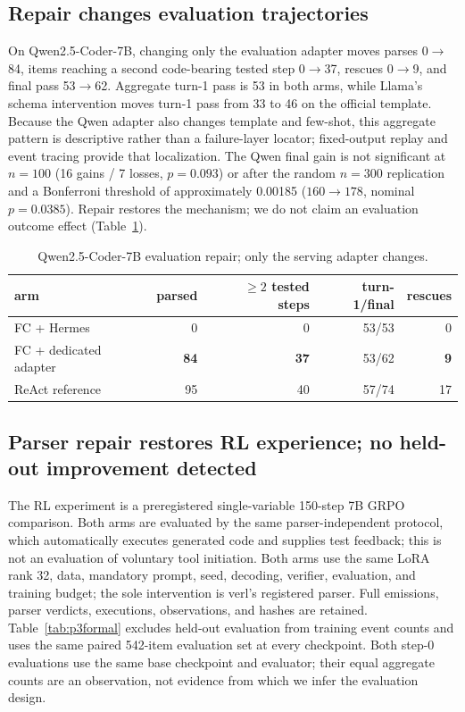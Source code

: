 \subsection{Repair changes evaluation trajectories}
\label{sec:repair}
\label{sec:maintable}

On Qwen2.5-Coder-7B, changing only the evaluation adapter moves parses 0$\rightarrow$84, items
reaching a second code-bearing tested step 0$\rightarrow$37, rescues 0$\rightarrow$9, and final pass
53$\rightarrow$62. Aggregate turn-1 pass is 53 in both arms, while Llama's schema intervention
moves turn-1 pass from 33 to 46 on the official template. Because the Qwen adapter also changes template and few-shot, this
aggregate pattern is descriptive rather than a failure-layer locator; fixed-output replay and
event tracing provide that localization. The Qwen final gain is not significant at
$n=100$ (16 gains / 7 losses, $p=0.093$) or after the random $n=300$ replication and a Bonferroni threshold of
approximately 0.00185 ($160\rightarrow178$, nominal $p=0.0385$). Repair restores the mechanism;
we do not claim an evaluation outcome effect (Table~\ref{tab:repair_main}).

\begin{table}[H]
\caption{Qwen2.5-Coder-7B evaluation repair; only the serving adapter changes.}
\label{tab:repair_main}
\centering
\small
\begin{tabular}{lrrrr}
\toprule
arm & parsed & $\geq2$ tested steps & turn-1/final & rescues \\
\midrule
FC + Hermes & 0 & 0 & 53/53 & 0 \\
FC + dedicated adapter & \textbf{84} & \textbf{37} & 53/62 & \textbf{9} \\
ReAct reference & 95 & 40 & 57/74 & 17 \\
\bottomrule
\end{tabular}
\end{table}

\subsection{Parser repair restores RL experience; no held-out improvement detected}
\label{sec:rl}
\label{sec:norepair}
\label{sec:sufficiency}

The RL experiment is a preregistered single-variable 150-step 7B GRPO comparison. Both arms
are evaluated by the same parser-independent protocol, which automatically executes generated
code and supplies test feedback; this is not an evaluation of voluntary tool initiation. Both arms use the same
LoRA rank 32, data, mandatory prompt, seed, decoding, verifier, evaluation, and training budget;
the sole intervention is verl's registered parser. Full emissions, parser verdicts, executions,
observations, and hashes are retained. Table~\ref{tab:p3formal} excludes held-out evaluation from
training event counts and uses the same paired 542-item evaluation set at every checkpoint. Both
step-0 evaluations use the same base checkpoint and evaluator; their equal aggregate counts are
an observation, not evidence from which we infer the evaluation design.

